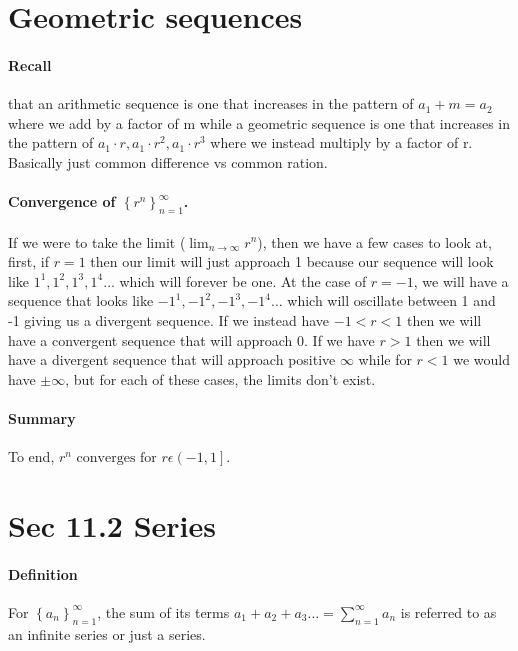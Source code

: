 \section{Geometric sequences}%
\label{sec:Geometric sequences}
\paragraph{Recall}
that an arithmetic sequence is one that increases in the pattern of $ a_1 + m = a_2 $ where we add by a factor of m while a geometric sequence is one that increases in the pattern of $ a_1 \cdot r, a_1 \cdot r^2, a_1 \cdot r^{ 3 }$ where we instead multiply by a factor of r. Basically just common difference vs common ration. 

\paragraph{Convergence of $ \left\{ r^{ n } \right\}_{ n=1 }^{ \infty }  $.}
If we were to take the limit ($ \lim_{ n \to \infty} r^{ n }$), then we have a few cases to look at, first, if $ r=1 $ then our limit will just approach 1 because our sequence will look like $ 1^{ 1 }, 1^{ 2 },1^{ 3 },1^{ 4 }\ldots $ which will forever be one. At the case of $ r=-1 $, we will have a sequence that looks like $ -1^{ 1 }, -1^{ 2 }, -1^{ 3 }, -1^{ 4 }\ldots $ which will oscillate between 1 and -1 giving us a divergent sequence. If we instead have $ -1<r<1 $ then we will have a convergent sequence that will approach 0. If we have $ r>1 $ then we will have a divergent sequence that will approach positive $ \infty $ while for $ r<1 $ we would have $ \pm \infty $, but for each of these cases, the limits don't exist. 

\paragraph{Summary}
To end, $ r^{ n } \text{ converges for } r\epsilon\left( -1,1 \right] $.

\section{Sec 11.2 Series}%
\label{sec:Sec 11.2 Series}

\paragraph{Definition\\}
For $ \left\{ a_n \right\} ^{ \infty }_{ n=1 } $, the sum of its terms $ a_1 + a_2 + a_3 \ldots = \sum_{ n=1 } ^{ \infty } a_n$ is referred to as an infinite series or just a series. \\

